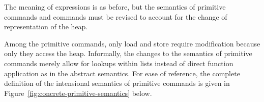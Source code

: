 \documentclass[11pt]{article}
\begin{document}
The meaning of expressions is as before, but the semantics of primitive commands and commands must be revised to account for the change of representation of the heap. 

Among the primitive commands, only load and store require modification because only they access the heap. Informally, the changes to the semantics of primitive commands merely allow for lookups within lists instead of direct function application as in the abstract semantics. For ease of reference, the complete definition of the intensional semantics of primitive commands is given in Figure~\ref{fig:concrete-primitive-semantics} below.

\begin{figure}[p]
	\centering
\end{figure}
\end{document}
